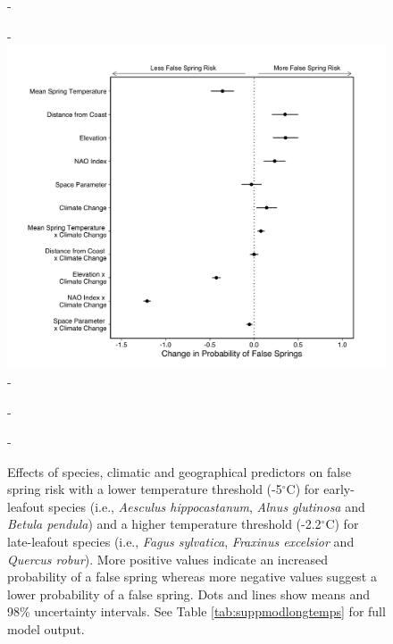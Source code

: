 \documentclass{article}\usepackage[]{graphicx}\usepackage[]{color}
\makeatletter
\newenvironment{kframe}{%
 \def\at@end@of@kframe{}%
 \ifinner\ifhmode%
  \def\at@end@of@kframe{\end{minipage}}%
  \begin{minipage}{\columnwidth}%
 \fi\fi%
 \def\FrameCommand##1{\hskip\@totalleftmargin \hskip-\fboxsep
 \colorbox{shadecolor}{##1}\hskip-\fboxsep
     \hskip-\linewidth \hskip-\@totalleftmargin \hskip\columnwidth}%
 \MakeFramed {\advance\hsize-\width
   \@totalleftmargin\z@ \linewidth\hsize
   \@setminipage}}%
 {\par\unskip\endMakeFramed%
 \at@end@of@kframe}
\makeatother
\begin{document}
\newpage
\begin{kframe}


{\ttfamily\noindent\bfseries{}}\end{kframe}

  {\begin{figure} [H]
  -\begin{center}
  -\includegraphics[width=12cm]{..//analyses/figures/model_output_98_longtemps.png}
  -\caption{Effects of species, climatic and geographical predictors on false spring risk with a lower temperature threshold (-5$^{\circ}$C) for early-leafout species (i.e., \textit{Aesculus hippocastanum}, \textit{Alnus glutinosa} and \textit{Betula pendula}) and a higher temperature threshold (-2.2$^{\circ}$C) for late-leafout species (i.e., \textit{Fagus sylvatica}, \textit{Fraxinus excelsior} and \textit{Quercus robur}). More positive values indicate an increased probability of a false spring whereas more negative values suggest a lower probability of a false spring. Dots and lines show means and 98\% uncertainty intervals. See Table \ref{tab:suppmodlongtemps} for full model output. }\label{fig:longtemps}
  -\end{center}
  -\end{figure}}
  
\newpage
\begin{kframe}


{\ttfamily\noindent\bfseries{}}\end{kframe}
\end{document}
